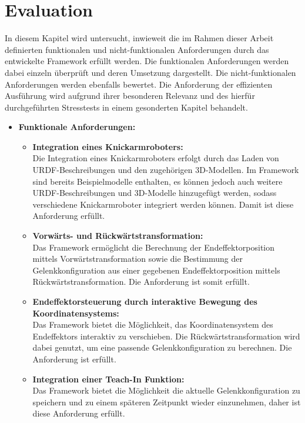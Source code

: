 \section{Evaluation}
In diesem Kapitel wird untersucht, inwieweit die im Rahmen dieser Arbeit definierten funktionalen und nicht-funktionalen Anforderungen durch das entwickelte Framework erfüllt werden.  
Die funktionalen Anforderungen werden dabei einzeln überprüft und deren Umsetzung dargestellt.  
Die nicht-funktionalen Anforderungen werden ebenfalls bewertet.
Die Anforderung der effizienten Ausführung wird aufgrund ihrer besonderen Relevanz und des hierfür durchgeführten Stresstests in einem gesonderten Kapitel behandelt.

\begin{itemize}
    \item \textbf{Funktionale Anforderungen:}
    \begin{itemize}
        \item \textbf{Integration eines Knickarmroboters:} \\
        Die Integration eines Knickarmroboters erfolgt durch das Laden von URDF-Be\-schrei\-bun\-gen und den zugehörigen 3D-Modellen.
        Im Framework sind bereits Beispielmodelle enthalten, es können jedoch auch weitere URDF-Be\-schrei\-bun\-gen und 3D-Modelle hinzugefügt werden,
        sodass verschiedene Knick\-arm\-ro\-bo\-ter integriert werden können. Damit ist diese Anforderung erfüllt.

        \item \textbf{Vorwärts- und Rückwärtstransformation:} \\
        Das Framework ermöglicht die Berechnung der Endeffektorposition mittels Vorwärtstransformation sowie die Bestimmung der Gelenkkonfiguration aus einer gegebenen Endeffektorposition mittels Rückwärtstransformation. Die Anforderung ist somit erfüllt.

        \item \textbf{Endeffektorsteuerung durch interaktive Bewegung des Koordinatensystems:} \\
        Das Framework bietet die Möglichkeit, das Koordinatensystem des Endeffektors interaktiv zu verschieben. Die Rückwärtstransformation wird dabei genutzt, um eine passende Gelenkkonfiguration zu berechnen. Die Anforderung ist erfüllt.

        \item \textbf{Integration einer Teach-In Funktion:} \\
        Das Framework bietet die Möglichkeit die aktuelle Gelenkkonfiguration zu speichern und zu einem späteren Zeitpunkt wieder einzunehmen, daher ist diese Anforderung erfüllt.


\end{itemize}
\end{itemize}
